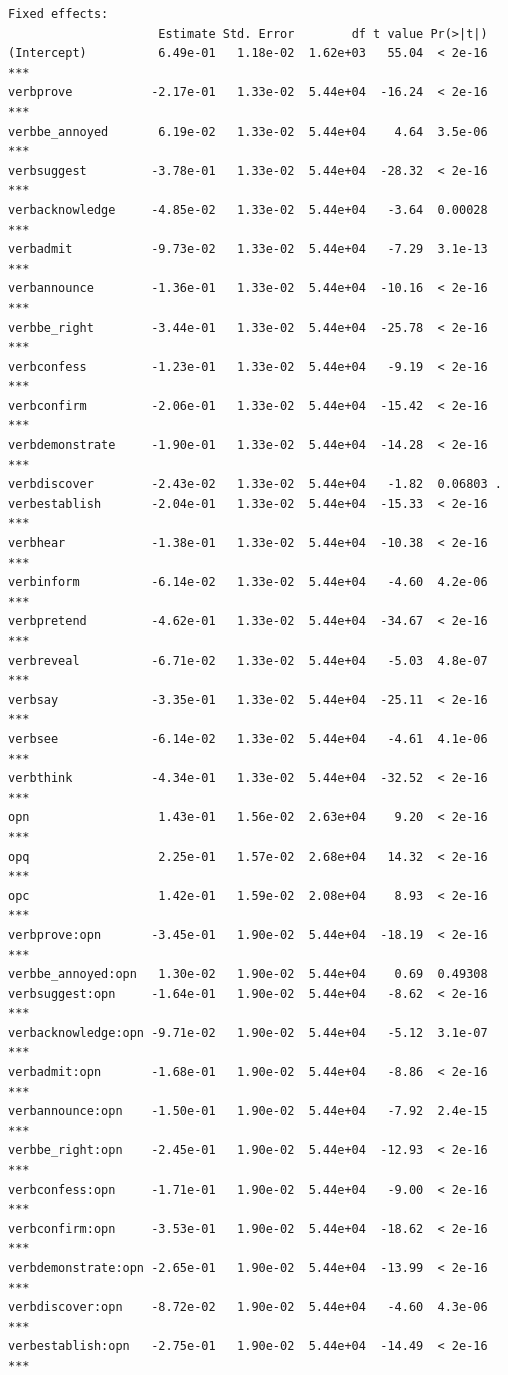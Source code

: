 \documentclass[10pt]{article}\usepackage[]{graphicx}\usepackage[]{color}
\makeatletter
\newenvironment{kframe}{%
 \def\at@end@of@kframe{}%
 \ifinner\ifhmode%
  \def\at@end@of@kframe{\end{minipage}}%
  \begin{minipage}{\columnwidth}%
 \fi\fi%
 \def\FrameCommand##1{\hskip\@totalleftmargin \hskip-\fboxsep
 \colorbox{shadecolor}{##1}\hskip-\fboxsep
     \hskip-\linewidth \hskip-\@totalleftmargin \hskip\columnwidth}%
 \MakeFramed {\advance\hsize-\width
   \@totalleftmargin\z@ \linewidth\hsize
   \@setminipage}}%
 {\par\unskip\endMakeFramed%
 \at@end@of@kframe}
\newenvironment{knitrout}{}{} %
\makeatother
\begin{document}
\begin{knitrout}
\begin{kframe}
\begin{verbatim}
Fixed effects:
                     Estimate Std. Error        df t value Pr(>|t|)    
(Intercept)          6.49e-01   1.18e-02  1.62e+03   55.04  < 2e-16 ***
verbprove           -2.17e-01   1.33e-02  5.44e+04  -16.24  < 2e-16 ***
verbbe_annoyed       6.19e-02   1.33e-02  5.44e+04    4.64  3.5e-06 ***
verbsuggest         -3.78e-01   1.33e-02  5.44e+04  -28.32  < 2e-16 ***
verbacknowledge     -4.85e-02   1.33e-02  5.44e+04   -3.64  0.00028 ***
verbadmit           -9.73e-02   1.33e-02  5.44e+04   -7.29  3.1e-13 ***
verbannounce        -1.36e-01   1.33e-02  5.44e+04  -10.16  < 2e-16 ***
verbbe_right        -3.44e-01   1.33e-02  5.44e+04  -25.78  < 2e-16 ***
verbconfess         -1.23e-01   1.33e-02  5.44e+04   -9.19  < 2e-16 ***
verbconfirm         -2.06e-01   1.33e-02  5.44e+04  -15.42  < 2e-16 ***
verbdemonstrate     -1.90e-01   1.33e-02  5.44e+04  -14.28  < 2e-16 ***
verbdiscover        -2.43e-02   1.33e-02  5.44e+04   -1.82  0.06803 .  
verbestablish       -2.04e-01   1.33e-02  5.44e+04  -15.33  < 2e-16 ***
verbhear            -1.38e-01   1.33e-02  5.44e+04  -10.38  < 2e-16 ***
verbinform          -6.14e-02   1.33e-02  5.44e+04   -4.60  4.2e-06 ***
verbpretend         -4.62e-01   1.33e-02  5.44e+04  -34.67  < 2e-16 ***
verbreveal          -6.71e-02   1.33e-02  5.44e+04   -5.03  4.8e-07 ***
verbsay             -3.35e-01   1.33e-02  5.44e+04  -25.11  < 2e-16 ***
verbsee             -6.14e-02   1.33e-02  5.44e+04   -4.61  4.1e-06 ***
verbthink           -4.34e-01   1.33e-02  5.44e+04  -32.52  < 2e-16 ***
opn                  1.43e-01   1.56e-02  2.63e+04    9.20  < 2e-16 ***
opq                  2.25e-01   1.57e-02  2.68e+04   14.32  < 2e-16 ***
opc                  1.42e-01   1.59e-02  2.08e+04    8.93  < 2e-16 ***
verbprove:opn       -3.45e-01   1.90e-02  5.44e+04  -18.19  < 2e-16 ***
verbbe_annoyed:opn   1.30e-02   1.90e-02  5.44e+04    0.69  0.49308    
verbsuggest:opn     -1.64e-01   1.90e-02  5.44e+04   -8.62  < 2e-16 ***
verbacknowledge:opn -9.71e-02   1.90e-02  5.44e+04   -5.12  3.1e-07 ***
verbadmit:opn       -1.68e-01   1.90e-02  5.44e+04   -8.86  < 2e-16 ***
verbannounce:opn    -1.50e-01   1.90e-02  5.44e+04   -7.92  2.4e-15 ***
verbbe_right:opn    -2.45e-01   1.90e-02  5.44e+04  -12.93  < 2e-16 ***
verbconfess:opn     -1.71e-01   1.90e-02  5.44e+04   -9.00  < 2e-16 ***
verbconfirm:opn     -3.53e-01   1.90e-02  5.44e+04  -18.62  < 2e-16 ***
verbdemonstrate:opn -2.65e-01   1.90e-02  5.44e+04  -13.99  < 2e-16 ***
verbdiscover:opn    -8.72e-02   1.90e-02  5.44e+04   -4.60  4.3e-06 ***
verbestablish:opn   -2.75e-01   1.90e-02  5.44e+04  -14.49  < 2e-16 ***

\end{verbatim}
\end{kframe}
\end{knitrout}
\end{document}
